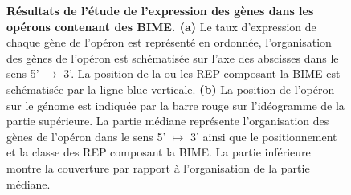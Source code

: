 \documentclass[12pt,a4paper]{report}
\begin{document}
\begin{onehalfspace}
\begin{figure}[ht]
\centering
{}
\caption{\textbf{Résultats de l'étude de l'expression des gènes dans les opérons contenant des BIME. (a)} Le taux d'expression de chaque gène de l'opéron est représenté en ordonnée, l'organisation des gènes de l'opéron est schématisée sur l'axe des abscisses dans le sens 5' $\mapsto$ 3'. La position de la ou les REP composant la BIME est schématisée par la ligne blue verticale. \textbf{(b)} La position de l'opéron sur le génome est indiquée par la barre rouge sur l'idéogramme de la partie supérieure. La partie médiane représente l'organisation des gènes de l'opéron dans le sens 5' $\mapsto$ 3' ainsi que le positionnement et la classe des REP composant la BIME. La partie inférieure montre la couverture par rapport à l'organisation de la partie médiane.}
\label{fig:expression} 
\end{figure}


\end{onehalfspace}
\end{document}
